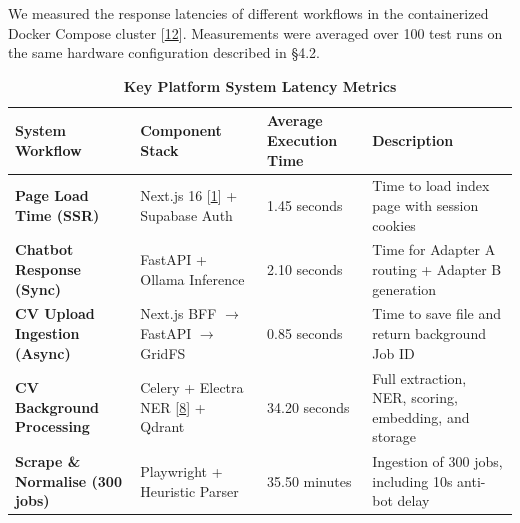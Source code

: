\documentclass[12pt, a4paper]{report}
\begin{document}
\vspace{0.8cm}
\vspace{0.4cm}

We measured the response latencies of different workflows in the containerized Docker Compose cluster [\hyperlink{cite12}{12}]. Measurements were averaged over 100 test runs on the same hardware configuration described in \S4.2.

\begin{table}[H]
    \centering
    \caption[Key Platform System Latency Metrics]{\textbf{Key Platform System Latency Metrics}}
    \vspace{0.2cm}
    \normalsize
    \renewcommand{\arraystretch}{1.3}
    \begin{tabularx}{\textwidth}{Z{0.9} | Z{0.9} | Z{0.8} | Z{1.4}}
    \hline\hline
    System Workflow & Component Stack & Average Execution Time & Description \\
    \hline
    \textbf{Page Load Time (SSR)} & Next.js 16 [\hyperlink{cite1}{1}] + Supabase Auth & 1.45 seconds & Time to load index page with session cookies \\
    \textbf{Chatbot Response (Sync)} & FastAPI + Ollama Inference & 2.10 seconds & Time for Adapter A routing + Adapter B generation \\
    \textbf{CV Upload Ingestion (Async)} & Next.js BFF $\rightarrow$ FastAPI $\rightarrow$ GridFS & 0.85 seconds & Time to save file and return background Job ID \\
    \textbf{CV Background Processing} & Celery + Electra NER [\hyperlink{cite8}{8}] + Qdrant & 34.20 seconds & Full extraction, NER, scoring, embedding, and storage \\
    \textbf{Scrape \& Normalise (300 jobs)} & Playwright + Heuristic Parser & 35.50 minutes & Ingestion of 300 jobs, including 10s anti-bot delay \\
    \hline\hline
    \end{tabularx}
\end{table}

\vspace{0.8cm}
\vspace{0.4cm}
\end{document}

